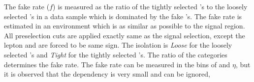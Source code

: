 The fake rate ($f$) is measured as the ratio of the tightly selected \Tau's to the loosely 
selected \Tau's in a data sample which is dominated by the fake \Tau's. The fake rate is estimated in an environment which is as 
similar as possible to the signal region. 
All preselection cuts are applied exactly same as the signal selection,  except the lepton and \Tau are forced to be same sign. 
The \Tau isolation is {\it Loose} for the loosely selected \Tau's and {\it Tight} for the tightly selected \Tau's.
The ratio of the  categories determines the fake rate. 
The fake rate can be measured in the bins of \Tau \pt and $\eta$, but it is observed that the dependency is very small and can be ignored, 
